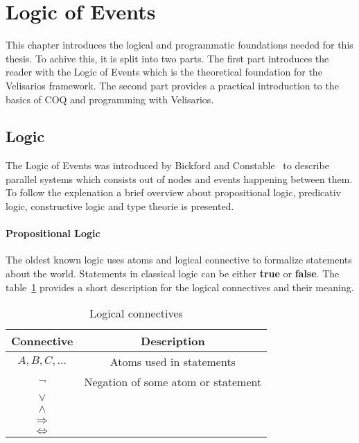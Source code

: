\section{Logic of Events}
\label{sec_logic}


This chapter introduces the logical and programmatic foundations needed for this
thesis. To achive this, it is split into two parts. The first part introduces
the reader with the Logic of Events which is the theoretical foundation for the
Velisarios framework. The second part provides a practical introduction to
the basics of COQ and programming with Velisarios.

\subsection{Logic}

The Logic of Events was introduced by Bickford and
Constable~\cite{bickford2003logic} to describe parallel systems which
consists out of nodes and events happening between them. To follow
the explenation a brief overview about propositional logic, predicativ logic,
constructive logic and type theorie is presented.

\paragraph{Propositional Logic}
The oldest known logic uses atoms and logical connective to formalize
statements about the world. Statements in classical logic can be either
\textbf{true} or \textbf{false}. The table~\ref{tab:proplogic} provides
a short description for the logical connectives and their meaning.

\begin{table}[h]
  \centering
  \begin{tabular}{c|c}
    Connective & Description\\\hline
    $A,B,C,...$ & Atoms used in statements\\
    $\neg$ & Negation of some atom or statement\\
    $\vee$ & \\
    $\wedge$ & \\
    $\Rightarrow$ & \\
    $\Leftrightarrow$ & \\
  \end{tabular}
  \caption{Logical connectives}
  \label{tab:proplogic}
\end{table}


